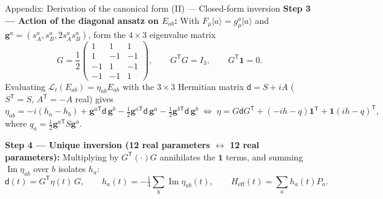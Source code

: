 \documentclass[aspectratio=169,11pt]{beamer}
\newcommand{\ket}[1]{\lvert #1\rangle}
\newcommand{\dmat}{\mathsf d}
\newcommand{\Heff}{H_{\mathrm{eff}}}
\begin{document}
\begin{frame}{Appendix: Derivation of the canonical form (II) --- Closed-form inversion}
\small
\textbf{Step 3 --- Action of the diagonal ansatz on $E_{ab}$:}
With $F_\mu\ket a=g_\mu^a\ket a$ and $\mathbf g^a=(s_A^a,s_B^a,2s_A^as_B^a)$, form the $4\times3$ eigenvalue matrix
\[
G=\frac12\begin{pmatrix}1&1&1\\1&-1&-1\\-1&1&-1\\-1&-1&1\end{pmatrix},\qquad
G^{\mathsf T}G=I_3,\qquad G^{\mathsf T}\mathbf1=0.
\]
Evaluating $\mathcal L_t(E_{ab})=\eta_{ab}E_{ab}$ with the $3\times3$ Hermitian matrix $\dmat=S+iA$ ($S^{\mathsf T}=S$, $A^{\mathsf T}=-A$ real) gives
\[
\eta_{ab}=-i(h_a-h_b)+\mathbf g^{a\mathsf T}\dmat\,\mathbf g^b
-\tfrac12\mathbf g^{a\mathsf T}\dmat\,\mathbf g^a-\tfrac12\mathbf g^{b\mathsf T}\dmat\,\mathbf g^b
\;\Longleftrightarrow\;
\eta=G\dmat G^{\mathsf T}+(-ih-q)\mathbf1^{\mathsf T}+\mathbf1(ih-q)^{\mathsf T},
\]
where $q_a=\tfrac12\mathbf g^{a\mathsf T}S\mathbf g^a$.
\smallskip

\textbf{Step 4 --- Unique inversion (12 real parameters $\leftrightarrow$ 12 real parameters):}
Multiplying by $G^{\mathsf T}(\cdot)G$ annihilates the $\mathbf1$ terms, and summing $\operatorname{Im}\eta_{ab}$ over $b$ isolates $h_a$:
\[
\boxed{\dmat(t)=G^{\mathsf T}\eta(t)\,G,\qquad
h_a(t)=-\tfrac14\textstyle\sum_{b}\operatorname{Im}\eta_{ab}(t),\qquad
\Heff(t)=\textstyle\sum_a h_a(t)P_a.}
\]
\end{frame}
\end{document}
